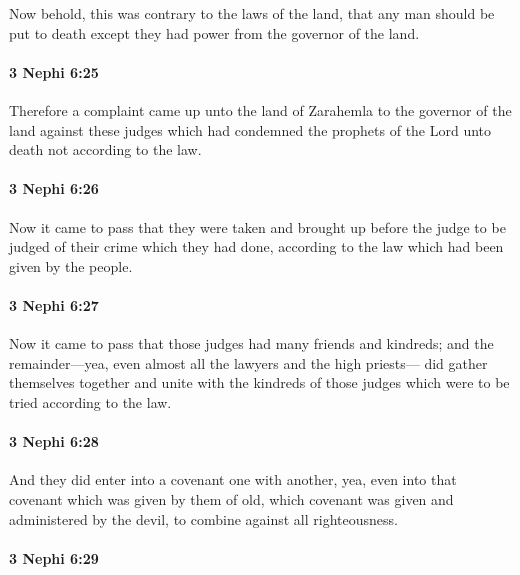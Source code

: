 			Now behold, this was contrary to the laws of the land,
			that any man should be put to death
			except they had power from the governor of the land.

		\paragraph{3 Nephi 6:25} %
			\label{3NEPHI-6-25}

			Therefore a complaint came up unto the land of Zarahemla
			to the governor of the land against these judges
			which had condemned the prophets of the Lord unto death
			not according to the law.

		\paragraph{3 Nephi 6:26} %
			\label{3NEPHI-6-26}

			Now it came to pass that they were taken
			and brought up before the judge to be judged of their crime which they had done,
			according to the law which had been given by the people.

		\paragraph{3 Nephi 6:27} %
			\label{3NEPHI-6-27}

			Now it came to pass that
			those judges had many friends and kindreds;
			and the remainder---yea, even almost all the lawyers and the high priests---
			did gather themselves together and unite with the kindreds of those judges
			which were to be tried according to the law.

		\paragraph{3 Nephi 6:28} %
			\label{3NEPHI-6-28}

			And they did enter into a covenant one with another,
			yea, even into that covenant which was given by them of old,
			which covenant was given and administered by the devil,
			to combine against all righteousness.

		\paragraph{3 Nephi 6:29} %
			\label{3NEPHI-6-29}

